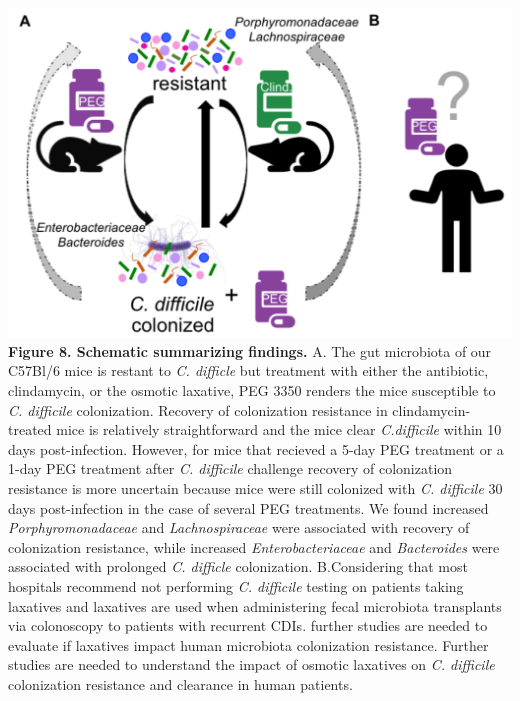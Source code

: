 \documentclass[
  11pt,
]{article}
\begin{document}
\includegraphics{figure_8.pdf} \textbf{Figure 8. Schematic summarizing
findings.} A. The gut microbiota of our C57Bl/6 mice is restant to
\emph{C. difficle} but treatment with either the antibiotic,
clindamycin, or the osmotic laxative, PEG 3350 renders the mice
susceptible to \emph{C. difficile} colonization. Recovery of
colonization resistance in clindamycin-treated mice is relatively
straightforward and the mice clear \emph{C.difficile} within 10 days
post-infection. However, for mice that recieved a 5-day PEG treatment or
a 1-day PEG treatment after \emph{C. difficile} challenge recovery of
colonization resistance is more uncertain because mice were still
colonized with \emph{C. difficile} 30 days post-infection in the case of
several PEG treatments. We found increased \emph{Porphyromonadaceae} and
\emph{Lachnospiraceae} were associated with recovery of colonization
resistance, while increased \emph{Enterobacteriaceae} and
\emph{Bacteroides} were associated with prolonged \emph{C. difficle}
colonization. B.Considering that most hospitals recommend not performing
\emph{C. difficile} testing on patients taking laxatives and laxatives
are used when administering fecal microbiota transplants via colonoscopy
to patients with recurrent CDIs. further studies are needed to evaluate
if laxatives impact human microbiota colonization resistance. Further
studies are needed to understand the impact of osmotic laxatives on
\emph{C. difficile} colonization resistance and clearance in human
patients. \newpage
\end{document}
